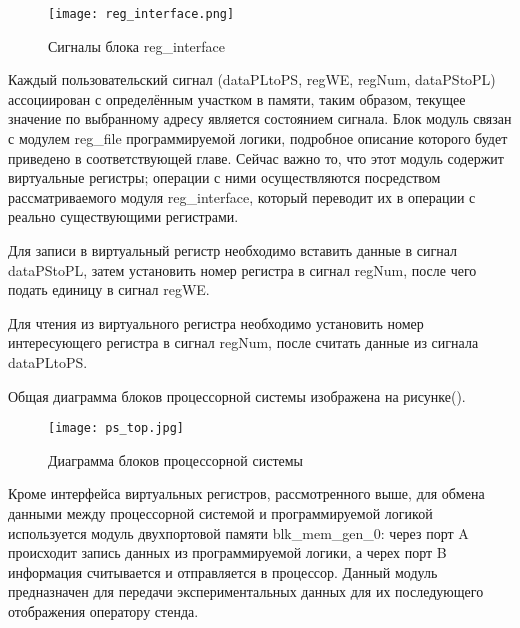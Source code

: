 \begin{figure}[ht]
    \centering
    \texttt{[image: reg\_interface.png]}
    \caption{Сигналы блока reg\_interface}
    \label{fig:mpr}
\end{figure}
Каждый пользовательский сигнал (dataPLtoPS, regWE, regNum, dataPStoPL) ассоциирован с определённым участком в памяти, таким образом, текущее значение по выбранному адресу является состоянием сигнала. Блок модуль связан с модулем reg\_file программируемой логики, подробное описание которого будет приведено в соответствующей главе. Сейчас важно то, что этот модуль содержит виртуальные регистры; операции с ними осуществляются посредством рассматриваемого модуля reg\_interface, который переводит их в операции с реально существующими регистрами.\par
Для записи в виртуальный регистр необходимо вставить данные в сигнал dataPStoPL, затем установить номер регистра в сигнал regNum, после чего подать единицу в сигнал regWE.\par
Для чтения из виртуального регистра необходимо установить номер интересующего регистра в сигнал regNum, после считать данные из сигнала dataPLtoPS.\par
Общая диаграмма блоков процессорной системы изображена на рисунке().\par
\begin{figure}[ht]
    \centering
    \texttt{[image: ps\_top.jpg]}
    \caption{Диаграмма блоков процессорной системы}
    \label{fig:mpr}
\end{figure}
Кроме интерфейса виртуальных регистров, рассмотренного выше, для обмена данными между процессорной системой и программируемой логикой используется модуль двухпортовой памяти blk\_mem\_gen\_0: через порт A происходит запись данных из программируемой логики, а черех порт B информация считывается и отправляется в процессор. Данный модуль предназначен для передачи экспериментальных данных для их последующего отображения оператору стенда.
